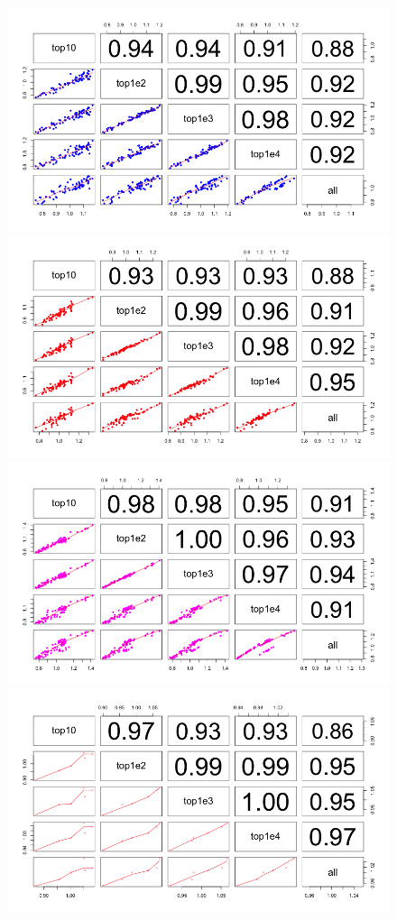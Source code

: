 \documentclass[11pt, a4paper]{article}
\begin{document}
 \begin{figure}[h!]
\begin{center}
\includegraphics[scale=0.2]{Figures/norm1.png}
\includegraphics[scale=0.2]{Figures/norm2.png}
\includegraphics[scale=0.2]{Figures/norm3.png}
\includegraphics[scale=0.2]{Figures/norm4.png}

\end{center}
\end{figure}
\end{document}
